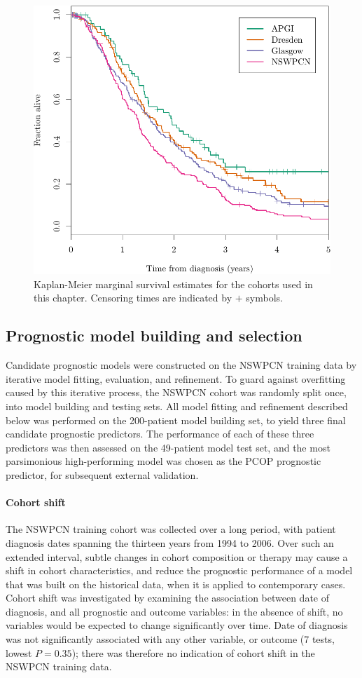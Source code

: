 \documentclass[dissertation.tex]{subfiles}
\begin{document}
\begin{figure}
\centering
  \includegraphics[width=.7\textwidth]{analysis/nomogram/figure/07-cohort-surv-comparison-1}
\caption[Cohort marginal survival estimates]{Kaplan-Meier marginal survival estimates for the cohorts used in this chapter.  Censoring times are indicated by $+$ symbols.}
\label{fig:nomo-cohort-km}
\end{figure}

\subsection{Prognostic model building and selection}
Candidate prognostic models were constructed on the \gls{NSWPCN} training data by iterative model fitting, evaluation, and refinement.  To guard against overfitting caused by this iterative process, the \gls{NSWPCN} cohort was randomly split once, into model building and testing sets.  All model fitting and refinement described below was performed on the 200-patient model building set, to yield three final candidate prognostic predictors.  The performance of each of these three predictors was then assessed on the 49-patient model test set, and the most parsimonious high-performing model was chosen as the \gls{PCOP} prognostic predictor, for subsequent external validation.

\paragraph{Cohort shift}
The \gls{NSWPCN} training cohort was collected over a long period, with patient diagnosis dates spanning the thirteen years from 1994 to 2006.  Over such an extended interval, subtle changes in cohort composition or therapy may cause a shift in cohort characteristics, and reduce the prognostic performance of a model that was built on the historical data, when it is applied to contemporary cases.  Cohort shift was investigated by examining the association between date of diagnosis, and all prognostic and outcome variables: in the absence of shift, no variables would be expected to change significantly over time.  Date of diagnosis was not significantly associated with any other variable, or outcome (7 tests, lowest $P = 0.35$); there was therefore no indication of cohort shift in the \gls{NSWPCN} training data.
\end{document}
